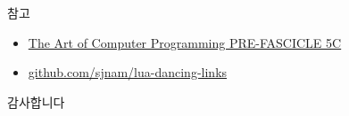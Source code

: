\documentclass{beamer}
\begin{document}
%
\begin{frame}{참고}
  \begin{itemize}
  \item \href{http://www-cs-faculty.stanford.edu/~knuth/fasc5c.ps.gz}
    {The Art of Computer Programming PRE-FASCICLE 5C}
  \item \href{https://github.com/sjnam/lua-dancing-links}
    {github.com/sjnam/lua-dancing-links}
  \end{itemize}
\end{frame}


%
\begin{frame}[standout]
  감사합니다
\end{frame}
\end{document}
